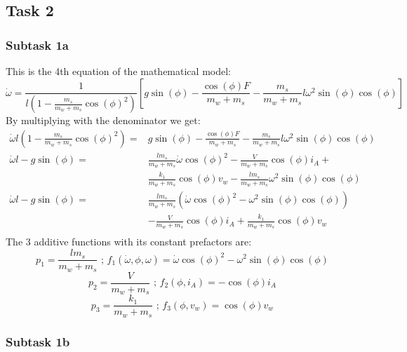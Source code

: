\documentclass[a4paper, 12pt]{scrartcl}
\begin{document}
\subsection{Task 2}
\subsubsection{Subtask 1a}
This is the 4th equation of the mathematical model:
\begin{equation}
	\dot{\omega} = \frac{1}{l\left(1-\frac{m_s}{m_w + m_s} \cos(\phi)^2\right)} \left[ g \sin(\phi) -  \frac{\cos(\phi)F}{m_w + m_s} - \frac{m_s}{m_w + m_s} {l \omega^2} \sin(\phi) \cos(\phi) \right]
\end{equation}
By multiplying with the denominator we get: 
\begin{equation}
	\begin{split}
		\dot{\omega}l \left(1-\frac{m_s}{m_w + m_s} \cos(\phi)^2\right) = & g \sin(\phi) -  \frac{\cos(\phi)F}{m_w + m_s} - \frac{m_s}{m_w + m_s} {l \omega^2} \sin(\phi) \cos(\phi) \\
		\dot{\omega}l - g \sin(\phi) = & \frac{l m_s}{m_w + m_s} \dot{\omega} \cos(\phi)^2 - \frac{V}{m_w + m_s} \cos(\phi) i_A + \\
		& \frac{k_1}{m_w + m_s} \cos(\phi) v_w - \frac{l m_s}{m_w + m_s} \omega^2 \sin(\phi) \cos(\phi) \\
		\dot{\omega}l - g \sin(\phi) = & \frac{l m_s}{m_w + m_s} \left( \dot{\omega} \cos(\phi)^2 - \omega^2 \sin(\phi) \cos(\phi) \right) \\ 
		& - \frac{V}{m_w + m_s} \cos(\phi) i_A + \frac{k_1}{m_w + m_s} \cos(\phi) v_w \\
	\end{split}
\end{equation}
The 3 additive functions with its constant prefactors are: 
\begin{equation}
	p_1 = \frac{l m_s}{m_w + m_s} \text{ ; } f_1(\dot{\omega}, \phi, \omega) = \dot{\omega} \cos(\phi)^2 - \omega^2 \sin(\phi) \cos(\phi)
\end{equation}
\begin{equation}
	p_2 = \frac{V}{m_w + m_s}  \text{ ; } f_2(\phi, i_A) = -\cos(\phi) i_A
\end{equation}
\begin{equation}
	p_3 = \frac{k_1}{m_w + m_s} \text{ ; } f_3(\phi, v_w) = \cos(\phi) v_w
\end{equation}

\subsubsection{Subtask 1b}
\end{document}
